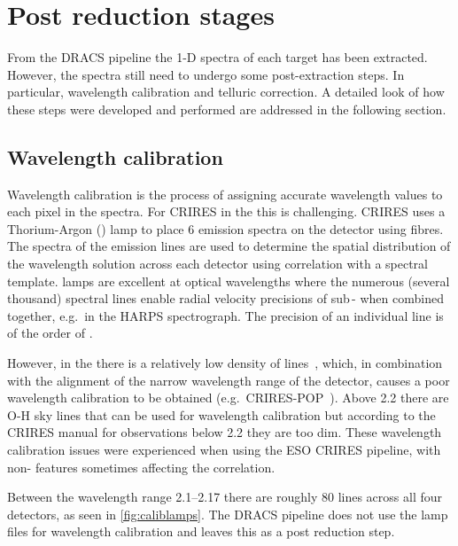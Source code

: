 
\section{Post reduction stages}
\label{sec:posreduction}
From the {DRACS} pipeline the 1-D spectra of each target has been extracted.
However, the spectra still need to undergo some post-extraction steps.
In particular, wavelength calibration and telluric correction.
A detailed look of how these steps were developed and performed are addressed in the following section.

\subsection{Wavelength calibration}
\label{subsec:wavecalib}
Wavelength calibration is the process of assigning accurate wavelength values to each pixel in the spectra.
For {CRIRES} in the \nir{} this is challenging.
{CRIRES} uses a Thorium-Argon (\thar) lamp to place 6 emission spectra on the detector using fibres.
The spectra of the \thar{} emission lines are used to determine the spatial distribution of the wavelength solution across each detector using correlation with a spectral template.
\thar{} lamps are excellent at optical wavelengths where the numerous (several thousand) spectral lines enable radial velocity precisions of sub\,-\mps{} when combined together, e.g.\ in the {HARPS} spectrograph.
The precision of an individual \thar{} line is of the order of \mps{}.

However, in the \nir{} there is a relatively low density of \thar{} lines~\citep{kerber_laboratory_2009}, which, in combination with the alignment of the narrow wavelength range of the detector, causes a poor wavelength calibration to be obtained (e.g.\ {CRIRES}-POP~\citep{nicholls_crirespop_2017}).
Above 2.2\um{} there are {O-H} sky lines that can be used for wavelength calibration but according to the {CRIRES} manual for observations below 2.2\um{} they are too dim.
These wavelength calibration issues were experienced when using the {ESO} {CRIRES} pipeline, with non-\thar{} features sometimes affecting the correlation.

Between the wavelength range 2.1--2.17\um{} there are roughly 80 \thar{} lines across all four detectors, as seen in \cref{fig:caliblamps}.
The {DRACS} pipeline does not use the \thar{} lamp files for wavelength calibration and leaves this as a post reduction step.

